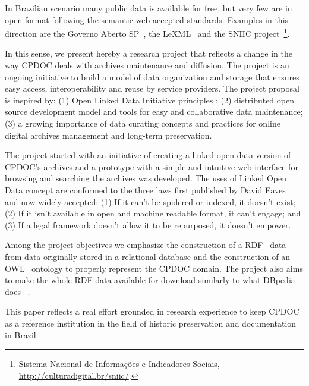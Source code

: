 In Brazilian scenario many public data is available for free, but very
few are in open format following the semantic web accepted
standards. Examples in this direction are the Governo Aberto
SP~\cite{gasp}, the LeXML~\cite{lexml} and the SNIIC
project~\footnote{Sistema Nacional de Informações e Indicadores
  Sociais, \url{http://culturadigital.br/sniic/}.}.

In this sense, we present hereby a research project that reflects a
change in the way CPDOC deals with archives maintenance and
diffusion. The project is an ongoing initiative to build a model of
data organization and storage that ensures easy access,
interoperability and reuse by service providers. The project proposal
is inspired by: (1) Open Linked Data Initiative principles \cite{odi};
(2) distributed open source development model and tools for easy and
collaborative data maintenance; (3) a growing importance of data
curating concepts and practices for online digital archives management
and long-term preservation.
   
The project started with an initiative of creating a linked open data
version of CPDOC's archives and a prototype with a simple and
intuitive web interface for browsing and searching the archives was
developed. The uses of Linked Open Data concept are conformed to the
three laws first published by David Eaves~\cite{3-law} and now widely
accepted: (1) If it can't be spidered or indexed, it doesn't exist;
(2) If it isn't available in open and machine readable format, it
can't engage; and (3) If a legal framework doesn't allow it to be
repurposed, it doesn't empower.

Among the project objectives we emphasize the construction of a
RDF~\cite{rdf-primer} data from data originally stored in a relational
database and the construction of an OWL~\cite{owl} ontology to
properly represent the CPDOC domain.
The project also aims to make the whole RDF data available for
download similarly to what DBpedia does ~\cite{dbpedia}.

   
This paper reflects a real effort grounded in research experience to
keep CPDOC as a reference institution in the field of historic
preservation and documentation in Brazil.

